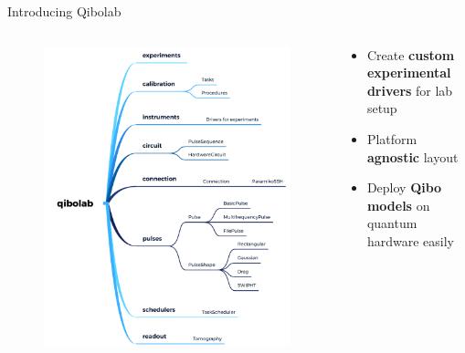 \documentclass[11p,aspectratio=169]{beamer}
\begin{document}
\begin{frame}{Introducing Qibolab}
    \begin{columns}
        \begin{column}[]{0.5 \textwidth}
            \begin{figure}
                \includegraphics[height=0.8\textheight]{figures/qibolab.png}
            \end{figure}
            
        \end{column}

        \begin{column}[]{0.5 \textwidth}
            \begin{tcolorbox}[colframe=gray,title=Qibolab key features:]
                \begin{itemize}
                    \item Create \textbf{custom experimental drivers} for lab setup
                    \item Platform \textbf{agnostic} layout
                    \item Deploy \textbf{Qibo models} on quantum hardware easily
                \end{itemize}
                \end{tcolorbox}
        \end{column}
    \end{columns}
\end{frame}
\end{document}

